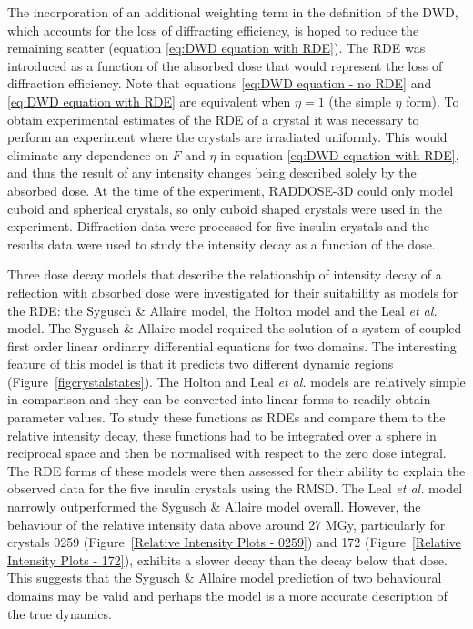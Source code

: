 The incorporation of an additional weighting term in the definition of the DWD, which accounts for the loss of diffracting efficiency, is hoped to reduce the remaining scatter (equation \ref{eq:DWD equation with RDE}).
The RDE was introduced as a function of the absorbed dose that would represent the loss of diffraction efficiency.
Note that equations \ref{eq:DWD equation - no RDE} and \ref{eq:DWD equation with RDE} are equivalent when $\eta = 1$ (the simple $\eta$ form).
To obtain experimental estimates of the RDE of a crystal it was necessary to perform an experiment where the crystals are irradiated uniformly.
This would eliminate any dependence on $F$ and $\eta$ in equation \ref{eq:DWD equation with RDE}, and thus the result of any intensity changes being described solely by the absorbed dose.
At the time of the experiment, RADDOSE-3D could only model cuboid and spherical crystals, so only cuboid shaped crystals were used in the experiment.
Diffraction data were processed for five insulin crystals and the results data were used to study the intensity decay as a function of the dose.

Three dose decay models that describe the relationship of intensity decay of a reflection with absorbed dose were investigated for their suitability as models for the RDE: the Sygusch \& Allaire model, the Holton model and the Leal \textit{et al.} model.
The Sygusch \& Allaire model required the solution of a system of coupled first order linear ordinary differential equations for two domains.
The interesting feature of this model is that it predicts two different dynamic regions (Figure~\ref{figcrystalstates}).
The Holton and Leal \textit{et al.} models are relatively simple in comparison and they can be converted into linear forms to readily obtain parameter values.
To study these functions as RDEs and compare them to the relative intensity decay, these functions had to be integrated over a sphere in reciprocal space and then be normalised with respect to the zero dose integral.
The RDE forms of these models were then assessed for their ability to explain the observed data for the five insulin crystals using the RMSD.
The Leal \textit{et al.} model narrowly outperformed the Sygusch \& Allaire model overall.
However, the behaviour of the relative intensity data above around 27 MGy, particularly for crystals 0259 (Figure~\ref{Relative Intensity Plots - 0259}) and 172 (Figure~\ref{Relative Intensity Plots - 172}), exhibits a slower decay than the decay below that dose.
This suggests that the Sygusch \& Allaire model prediction of two behavioural domains may be valid and perhaps the model is a more accurate description of the true dynamics.

